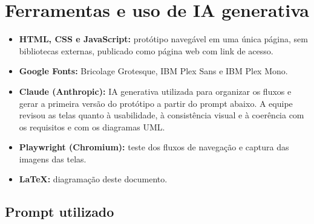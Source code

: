 \documentclass[11pt,a4paper]{article}
\begin{document}
\section{Ferramentas e uso de IA generativa}

\begin{itemize}
\item \textbf{HTML, CSS e JavaScript:} protótipo navegável em uma única página, sem bibliotecas externas, publicado como página web com link de acesso.
\item \textbf{Google Fonts:} Bricolage Grotesque, IBM Plex Sans e IBM Plex Mono.
\item \textbf{Claude (Anthropic):} IA generativa utilizada para organizar os fluxos e gerar a primeira versão do protótipo a partir do prompt abaixo. A equipe revisou as telas quanto à usabilidade, à consistência visual e à coerência com os requisitos e com os diagramas UML.
\item \textbf{Playwright (Chromium):} teste dos fluxos de navegação e captura das imagens das telas.
\item \textbf{LaTeX:} diagramação deste documento.
\end{itemize}

\subsection*{Prompt utilizado}
\end{document}
